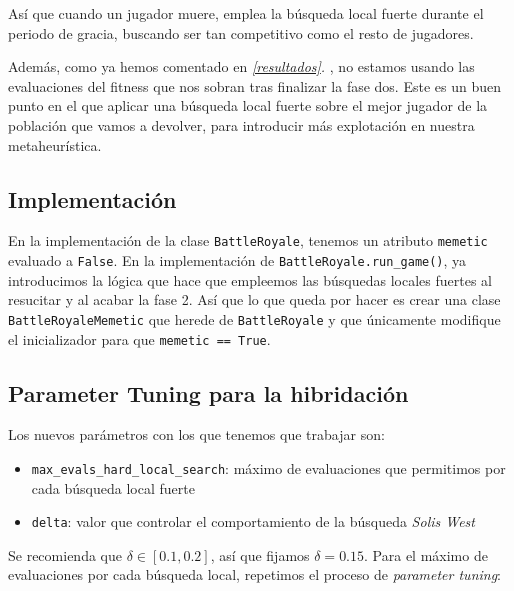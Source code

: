 \documentclass[11pt]{article}
\begin{document}
Así que cuando un jugador muere, emplea la búsqueda local fuerte durante el periodo de gracia, buscando ser tan competitivo como el resto de jugadores.

Además, como ya hemos comentado en \emph{\ref{resultados}. }, no estamos usando las evaluaciones del fitness que nos sobran tras finalizar la fase dos. Este es un buen punto en el que aplicar una búsqueda local fuerte sobre el mejor jugador de la población que vamos a devolver, para introducir más explotación en nuestra metaheurística.

\subsection{Implementación}

En la implementación de la clase \lstinline{BattleRoyale}, tenemos un atributo \lstinline{memetic} evaluado a \lstinline{False}. En la implementación de \lstinline{BattleRoyale.run_game()}, ya introducimos la lógica que hace que empleemos las búsquedas locales fuertes al resucitar y al acabar la fase 2. Así que lo que queda por hacer es crear una clase \lstinline{BattleRoyaleMemetic} que herede de \lstinline{BattleRoyale} y que únicamente modifique el inicializador para que \lstinline{memetic == True}.


\subsection{Parameter Tuning para la hibridación} \label{tuning_hib}

Los nuevos parámetros con los que tenemos que trabajar son:

\begin{itemize}
    \item \lstinline{max_evals_hard_local_search}: máximo de evaluaciones que permitimos por cada búsqueda local fuerte
    \item \lstinline{delta}: valor que controlar el comportamiento de la búsqueda \emph{Solis West}
\end{itemize}

Se recomienda que $\delta \in [0.1, 0.2]$, así que fijamos $\delta = 0.15$. Para el máximo de evaluaciones por cada búsqueda local, repetimos el proceso de \emph{parameter tuning}:
\end{document}

